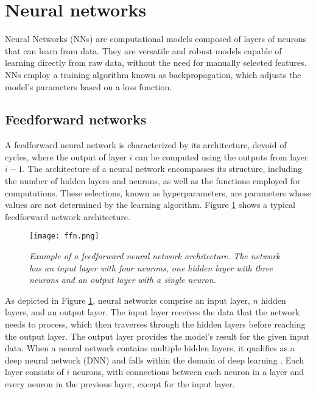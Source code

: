 \section{Neural networks}

Neural Networks (NNs) are computational models composed of layers of neurons that can learn from data. They are versatile and robust models capable of learning directly from raw data, without the need for manually selected features. NNs employ a training algorithm known as backpropagation, which adjusts the model's parameters based on a loss function.

\subsection{Feedforward networks}

A feedforward neural network is characterized by its architecture, devoid of cycles, where the output of layer \(i\) can be computed using the outputs from layer \(i - 1\). The architecture of a neural network encompasses its structure, including the number of hidden layers and neurons, as well as the functions employed for computations. These selections, known as hyperparameters, are parameters whose values are not determined by the learning algorithm. Figure \ref{fig:ffn} shows a typical feedforward network architecture.


\begin{figure}[H]
    \centering
    \texttt{[image: ffn.png]}
    \caption{
        \it{Example of a feedforward neural network architecture. The network has an
            input layer with four neurons, one hidden layer with three neurons and an output layer with a single neuron.}
    }
    \label{fig:ffn}
\end{figure}

As depicted in Figure \ref{fig:ffn}, neural networks comprise an input layer, \(n\) hidden layers, and an output layer. The input layer receives the data that the network needs to process, which then traverses through the hidden layers before reaching the output layer. The output layer provides the model's result for the given input data. When a neural network contains multiple hidden layers, it qualifies as a deep neural network (DNN) and falls within the domain of deep learning \cite{oshea2015introduction}. Each layer consists of \(i\) neurons, with connections between each neuron in a layer and every neuron in the previous layer, except for the input layer.

